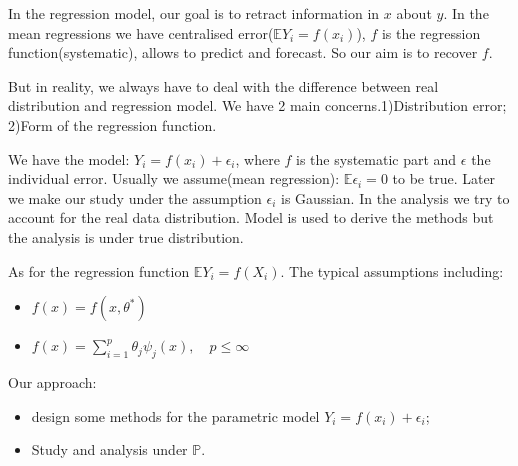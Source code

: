 \documentclass[a4paper,12pt, oneside, fleqn]{book}
\theoremstyle{definition}
\theoremstyle{remark}
\begin{document}
In the regression model, our goal is to retract information in $x$ about $y$. In the mean regressions we have centralised error($\mathbb{E} Y_i = f(x_i)$), $f$ is the regression function(systematic), allows to predict and forecast. So our aim is to recover $f$.\par 
But in reality, we always have to deal with the difference between real distribution and regression model. We have 2 main concerns.1)Distribution error; 2)Form of the regression function.\par 
We have the model: $Y_i = f(x_i) + \epsilon_i$, where $f$ is the systematic part and $\epsilon$ the individual error. Usually we assume(mean regression): $\mathbb{E} \epsilon_i = 0$ to be true. Later we make our study under the assumption $\epsilon_i$ is Gaussian. In the analysis we try to account for the real data distribution. Model is used to derive the methods but the analysis is under true distribution.\par 
As for the regression function $\mathbb{E} Y_i = f(X_i)$. The typical assumptions including:
\begin{itemize}
	\item $f(x) = f(x, \theta^*)$
	\item $f(x) = \sum_{i = 1}^p \theta_j \psi_j(x), \quad p \leq \infty$
\end{itemize}

Our approach:
\begin{itemize}
	\item design some methods for the parametric model $Y_i = f(x_i) + \epsilon_i$;
	\item Study and analysis under $\mathbb{P}$.
\end{itemize} 
\end{document}
